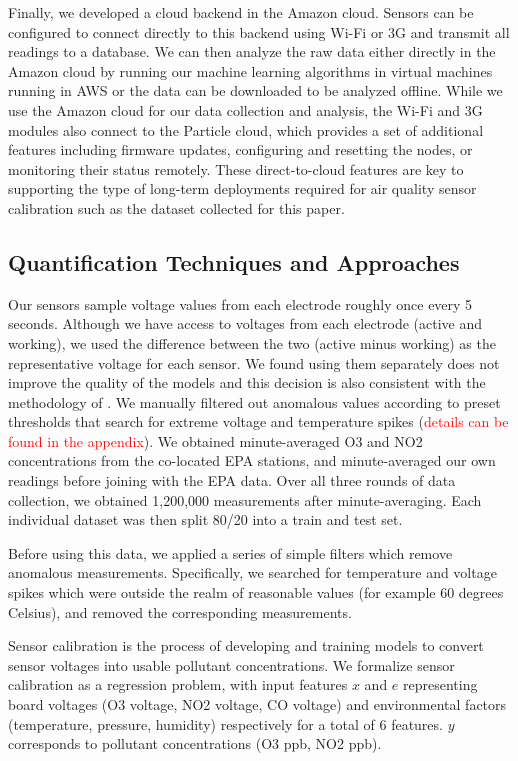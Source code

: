 \documentclass[journal abbreviation, manuscript]{copernicus}
\newcommand\todo[1]{\textcolor{red}{#1}}
\begin{document}
Finally, we developed a cloud backend in the Amazon cloud. Sensors can be configured to connect directly to this backend using Wi-Fi or 3G and transmit all readings to a database. We can then analyze the raw data either directly in the Amazon cloud by running our machine learning algorithms in virtual machines running in AWS or the data can be downloaded to be analyzed offline. While we use the Amazon cloud for our data collection and analysis, the Wi-Fi and 3G modules also connect to the Particle cloud, which provides a set of additional features including firmware updates, configuring and resetting the nodes, or monitoring their status remotely. These direct-to-cloud features are key to supporting the type of long-term deployments required for air quality sensor calibration such as the dataset collected for this paper.

\subsection{Quantification Techniques and Approaches}

Our sensors sample voltage values from each electrode roughly
once every 5 seconds. Although we have access to voltages from each electrode (active and working), we used the difference between the two (active minus working) as the representative voltage for each sensor. We found using them separately does not improve the quality of the models and this decision is also consistent with the methodology of \citet{Zimmerman2018}. We manually filtered out
anomalous values according to preset thresholds that search
for extreme voltage and temperature spikes (\todo{details can be found
in the appendix}). 
We obtained minute-averaged O3 and NO2 concentrations from the co-located EPA stations, and minute-averaged our own readings before joining
with the EPA data.
Over all three rounds of data collection, we obtained 1,200,000 measurements after minute-averaging. Each individual dataset was then split 80/20 into a train and test set.

Before using this data, we applied a series of simple filters which remove anomalous measurements. Specifically, we searched for temperature and voltage spikes which were outside the realm of reasonable values (for example 60 degrees Celsius), and removed the corresponding measurements.

Sensor calibration is the process of developing and training models to convert sensor voltages into usable pollutant concentrations. We formalize sensor calibration as a regression problem, with input features $x$ and $e$ representing board voltages (O3 voltage, NO2 voltage, CO voltage) and environmental factors (temperature, pressure, humidity) respectively for a total of 6 features. $y$ corresponds to pollutant concentrations (O3 ppb, NO2 ppb).
\end{document}
